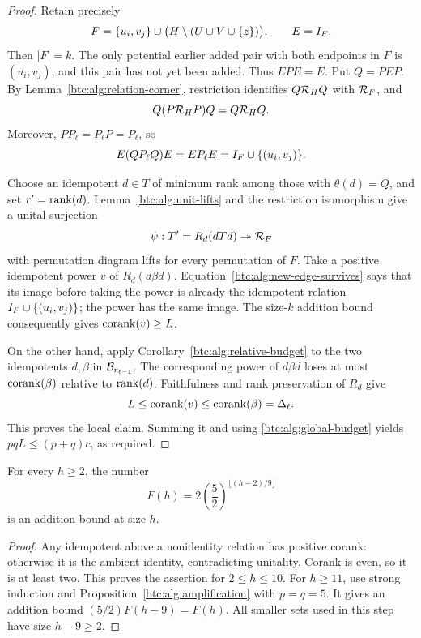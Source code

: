\begin{proof}
Retain precisely
\[
 F=\{u_i,v_j\}\cup
    \bigl(H\setminus(U\cup V\cup\{z\})\bigr),\qquad E=I_F.
\]
Then $|F|=k$. The only potential earlier added pair with both
endpoints in $F$ is $(u_i,v_j)$, and this pair has not yet been added.
Thus $EPE=E$. Put $Q=PEP$. By Lemma~\ref{btc:alg:relation-corner},
restriction identifies $Q\mathcal{R}_{H}Q$ with $\mathcal{R}_{F}$, and
\[
 Q(P\mathcal{R}_{H}P)Q=Q\mathcal{R}_{H}Q.
\]
Moreover, $PP_\ell=P_\ell P=P_\ell$, so
\begin{equation}\label{btc:alg:new-edge-survives}
 E(QP_\ell Q)E=EP_\ell E
 =I_F\cup\{(u_i,v_j)\}.
\end{equation}

Choose an idempotent $d\in T$ of minimum rank among those with
$\theta(d)=Q$, and set $r'=\operatorname{rank}(d)$. Lemma~\ref{btc:alg:unit-lifts}
and the restriction isomorphism give a unital surjection
\[
 \psi:T'=R_d(dTd)\twoheadrightarrow\mathcal{R}_{F}
\]
with permutation diagram lifts for every permutation of $F$.
Take a positive idempotent power $v$ of $R_d(d\beta d)$.
Equation~\eqref{btc:alg:new-edge-survives} says that its image before
taking the power is already the idempotent relation
$I_F\cup\{(u_i,v_j)\}$; the power has the same image.
The size-$k$ addition bound consequently gives $\operatorname{corank}(v)\ge L$.

On the other hand, apply Corollary~\ref{btc:alg:relative-budget} to the
two idempotents $d,\beta$ in $\mathcal{B}_{r_{\ell-1}}$. The corresponding
power of $d\beta d$ loses at most $\operatorname{corank}(\beta)$ relative to
$\operatorname{rank}(d)$. Faithfulness and rank preservation of $R_d$ give
\[
 L\le\operatorname{corank}(v)\le\operatorname{corank}(\beta)=\Delta_\ell.
\]
This proves the local claim. Summing it and using
\eqref{btc:alg:global-budget} yields $pqL\le(p+q)c$, as required.
\end{proof}

\begin{theorem}\label{btc:alg:rank}
For every $h\ge2$, the number
\begin{equation}\label{btc:alg:F}
 F(h)=2\left(\frac52\right)^{\lfloor(h-2)/9\rfloor}
\end{equation}
is an addition bound at size $h$.
\end{theorem}

\begin{proof}
Any idempotent above a nonidentity relation has positive corank:
otherwise it is the ambient identity, contradicting unitality.
Corank is even, so it is at least two. This proves the assertion
for $2\le h\le10$. For $h\ge11$, use strong induction and
Proposition~\ref{btc:alg:amplification} with $p=q=5$. It gives an
addition bound $(5/2)F(h-9)=F(h)$. All smaller sets used in this
step have size $h-9\ge2$.
\end{proof}

